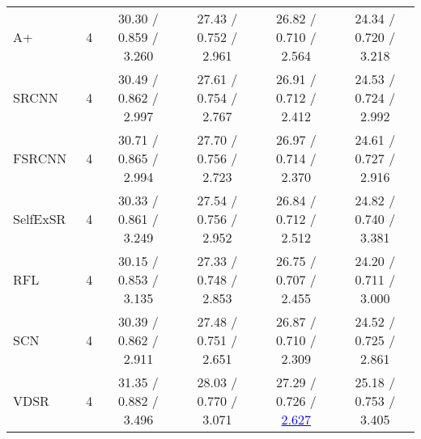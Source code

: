 \documentclass[10pt,twocolumn,letterpaper]{article}
\def\blue#1{\textcolor{blue}{#1}}
\begin{document}
\begin{table*}[t]
\begin{tabular}{lccccc}
A+~\cite{timofte2014a+}            & 4                      & 30.30 / 0.859 / 3.260                                                          & 27.43 / 0.752 / 2.961                                                          & 26.82 / 0.710 / 2.564                                                      & 24.34 / 0.720 / 3.218                                                          \\
SRCNN~\cite{dong2014learning}      & 4                      & 30.49 / 0.862 / 2.997                                                          & 27.61 / 0.754 / 2.767                                                          & 26.91 / 0.712 / 2.412                                                      & 24.53 / 0.724 / 2.992                                                          \\
FSRCNN~\cite{dong2016accelerating} & 4                      & 30.71 / 0.865 / 2.994                                                          & 27.70 / 0.756 / 2.723                                                          & 26.97 / 0.714 / 2.370                                                      & 24.61 / 0.727 / 2.916                                                          \\
SelfExSR~\cite{huang2015single}    & 4                      & 30.33 / 0.861 / 3.249                                                          & 27.54 / 0.756 / 2.952                                                          & 26.84 / 0.712 / 2.512                                                      & 24.82 / 0.740 / 3.381                                                          \\
RFL~\cite{schulter2015fast}        & 4                      & 30.15 / 0.853 / 3.135                                                          & 27.33 / 0.748 / 2.853                                                          & 26.75 / 0.707 / 2.455                                                      & 24.20 / 0.711 / 3.000                                                          \\
SCN~\cite{wang2015deep}            & 4                      & 30.39 / 0.862 / 2.911                                                          & 27.48 / 0.751 / 2.651                                                          & 26.87 / 0.710 / 2.309                                                      & 24.52 / 0.725 / 2.861                                                          \\
VDSR~\cite{kim2016accurate}        & 4                      & 31.35 / 0.882 / 3.496                                                          & 28.03 / 0.770 / 3.071                                                          & 27.29 / 0.726 / \blue{\underline{2.627}}                                   & 25.18 / 0.753 / 3.405                                                          \\

\end{tabular}
\end{table*}
\end{document}
